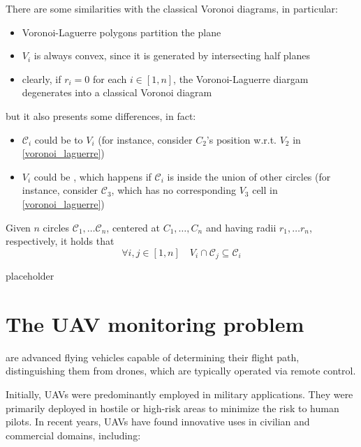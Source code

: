 \documentclass[a4paper, 12pt]{report}
\begin{document}
    There are some similarities with the classical Voronoi diagrams, in particular:

    \begin{itemize}
        \item Voronoi-Laguerre polygons partition the plane
        \item $V_i$ is always convex, since it is generated by intersecting half planes
        \item clearly, if $r_i = 0$ for each $i \in [1, n]$, the Voronoi-Laguerre diargam degenerates into a classical Voronoi diagram
    \end{itemize}

    but it also presents some differences, in fact:

    \begin{itemize}
        \item $\mathscr C_i$ could be  to $V_i$ (for instance, consider $C_2$'s position w.r.t. $V_2$ in \cref{voronoi_laguerre})
        \item $V_i$ could be , which happens if $\mathscr C_i$ is inside the union of other circles (for instance, consider $\mathscr C_3$, which has no corresponding $V_3$ cell in \cref{voronoi_laguerre})
    \end{itemize}

    \begin{framedthm}{}
        Given $n$ circles $\mathscr C_1, \ldots \mathscr C_n$, centered at $C_1, \ldots, C_n$ and having radii $r_1, \ldots r_n$, respectively, it holds that $$\forall i, j \in [1, n] \quad V_i \cap \mathscr C_j \subseteq \mathscr C_i$$
    \end{framedthm}

    placeholder 

    \chapter{The UAV monitoring problem}
    
     are advanced flying vehicles capable of  determining their flight path, distinguishing them from drones, which are typically operated via remote control.

    Initially, UAVs were predominantly employed in military applications. They were primarily deployed in hostile or high-risk areas to minimize the risk to human pilots. In recent years, UAVs have found innovative uses in civilian and commercial domains, including:
\end{document}
